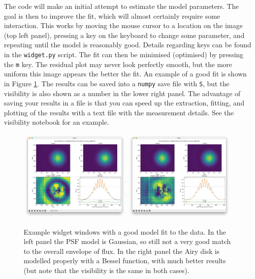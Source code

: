 \documentclass[11pt]{article}
\begin{document}
The code will make an initial attempt to estimate the model parameters. The goal is then to improve the fit, which will almost certainly require some interaction. This works by moving the mouse cursor to a location on the image (top left panel), pressing a key on the keyboard to change some parameter, and repeating until the model is reasonably good. Details regarding keys can be found in the \texttt{widget.py} script. The fit can then be minimised (optimised) by pressing the \texttt{m} key. The residual plot may never look perfectly smooth, but the more uniform this image appears the better the fit. An example of a good fit is shown in Figure \ref{fig:widget2}. The results can be saved into a \texttt{numpy} save file with \texttt{S}, but the visibility is also shown as a number in the lower right panel. The advantage of saving your results in a file is that you can speed up the extraction, fitting, and plotting of the results with a text file with the measurement details. See the visibility notebook for an example.

\begin{figure}[h]
    \centering
    \includegraphics[width=0.49\textwidth]{widget2.png}
    \includegraphics[width=0.49\textwidth]{widget3.png}
    \caption{Example widget windows with a good model fit to the data. In the left panel the PSF model is Gaussian, so still not a very good match to the overall envelope of flux. In the right panel the Airy disk is modelled properly with a Bessel function, with much better results (but note that the visibility is the same in both cases).}
    \label{fig:widget2}
\end{figure}
\end{document}
